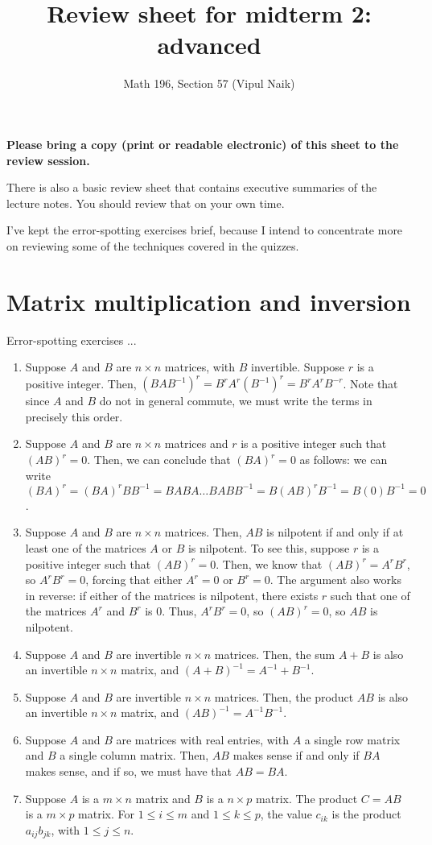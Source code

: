 \documentclass[10pt]{amsart}
\title{Review sheet for midterm 2: advanced}
\author{Math 196, Section 57 (Vipul Naik)}
\begin{document}
\maketitle

{\bf Please bring a copy (print or readable electronic) of this sheet
  to the review session.}

There is also a basic review sheet that contains executive summaries
of the lecture notes. You should review that on your own time.

I've kept the error-spotting exercises brief, because I intend to
concentrate more on reviewing some of the techniques covered in the
quizzes.
\section{Matrix multiplication and inversion}

Error-spotting exercises ...

\begin{enumerate}
\item Suppose $A$ and $B$ are $n \times n$ matrices, with $B$
  invertible. Suppose $r$ is a positive integer. Then, $(BAB^{-1})^r =
  B^rA^r(B^{-1})^r = B^rA^rB^{-r}$. Note that since $A$ and $B$ do not
  in general commute, we must write the terms in precisely this order.
\item Suppose $A$ and $B$ are $n \times n$ matrices and $r$ is a
  positive integer such that $(AB)^r = 0$. Then, we can conclude that
  $(BA)^r = 0$ as follows: we can write $(BA)^r = (BA)^rBB^{-1} = BABA
  \dots BABB^{-1} = B(AB)^rB^{-1} = B(0)B^{-1} = 0$.
\item Suppose $A$ and $B$ are $n \times n$ matrices. Then, $AB$ is
  nilpotent if and only if at least one of the matrices $A$ or $B$ is
  nilpotent. To see this, suppose $r$ is a positive integer such that
  $(AB)^r = 0$. Then, we know that $(AB)^r = A^rB^r$, so $A^rB^r = 0$,
  forcing that either $A^r = 0$ or $B^r = 0$. The argument also works
  in reverse: if either of the matrices is nilpotent, there exists $r$
  such that one of the matrices $A^r$ and $B^r$ is $0$. Thus, $A^rB^r
  = 0$, so $(AB)^r = 0$, so $AB$ is nilpotent.
\item Suppose $A$ and $B$ are invertible $n \times n$ matrices. Then,
  the sum $A + B$ is also an invertible $n \times n$ matrix, and $(A +
  B)^{-1} = A^{-1} + B^{-1}$.
\item Suppose $A$ and $B$ are invertible $n \times n$ matrices. Then,
  the product $AB$ is also an invertible $n \times n$ matrix, and
  $(AB)^{-1} = A^{-1}B^{-1}$.
\item Suppose $A$ and $B$ are matrices with real entries, with $A$ a
  single row matrix and $B$ a single column matrix. Then, $AB$ makes
  sense if and only if $BA$ makes sense, and if so, we must have that
  $AB = BA$.
\item Suppose $A$ is a $m \times n$ matrix and $B$ is a $n \times p$
  matrix. The product $C = AB$ is a $m \times p$ matrix. For $1 \le i
  \le m$ and $1 \le k \le p$, the value $c_{ik}$ is the product
  $a_{ij}b_{jk}$, with $1 \le j \le n$.
\end{enumerate}
\end{document}
